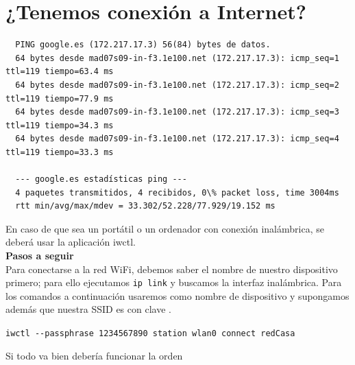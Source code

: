 \section{¿Tenemos conexión a Internet?}

\begin{center}
    
  \begin{tcolorbox}[title=Comprobamos la conexión a Internet]
  \scriptsize
  \begin{verbatim}
  PING google.es (172.217.17.3) 56(84) bytes de datos.
  64 bytes desde mad07s09-in-f3.1e100.net (172.217.17.3): icmp_seq=1 ttl=119 tiempo=63.4 ms
  64 bytes desde mad07s09-in-f3.1e100.net (172.217.17.3): icmp_seq=2 ttl=119 tiempo=77.9 ms
  64 bytes desde mad07s09-in-f3.1e100.net (172.217.17.3): icmp_seq=3 ttl=119 tiempo=34.3 ms
  64 bytes desde mad07s09-in-f3.1e100.net (172.217.17.3): icmp_seq=4 ttl=119 tiempo=33.3 ms

  --- google.es estadísticas ping ---
  4 paquetes transmitidos, 4 recibidos, 0\% packet loss, time 3004ms
  rtt min/avg/max/mdev = 33.302/52.228/77.929/19.152 ms
  \end{verbatim}
	\end{tcolorbox}

	\begin{tcolorbox}[title=Nota]
		En caso de que sea un portátil o un ordenador con conexión inalámbrica, se deberá usar la aplicación {\color{blue}\ttfamily iwctl}.\\

  \textbf{Pasos a seguir}\\
  Para conectarse a la red WiFi, debemos saber el nombre de nuestro dispositivo primero; para ello ejecutamos \texttt{ip link} y buscamos la interfaz inalámbrica. Para los comandos a continuación usaremos  como nombre de dispositivo y supongamos además que nuestra SSID es  con clave .

\begin{center}
  \verb+iwctl --passphrase 1234567890 station wlan0 connect redCasa+
\end{center}

Si todo va bien debería funcionar la orden 
	\end{tcolorbox}
\end{center}
\newpage
